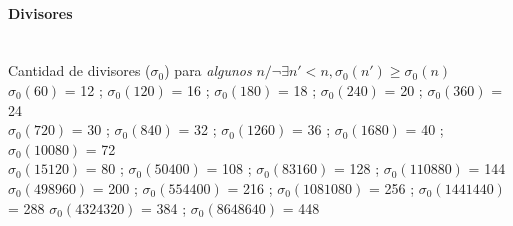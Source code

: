 \paragraph{Divisores} \ \\
Cantidad de divisores ($\sigma_0$) para \emph{algunos} $n / \neg\exists n'<n, \sigma_0(n') \geqslant \sigma_0(n)$ \\
$\sigma_0(60)$ = 12 ; $\sigma_0(120)$ = 16 ; $\sigma_0(180)$ = 18 ; $\sigma_0(240)$ = 20 ; $\sigma_0(360)$ = 24 \\
$\sigma_0(720)$ = 30 ; $\sigma_0(840)$ = 32 ; $\sigma_0(1260)$ = 36 ; $\sigma_0(1680)$ = 40 ; $\sigma_0(10080)$ = 72 \\ $\sigma_0(15120)$ = 80 ; $\sigma_0(50400)$ = 108 ; $\sigma_0(83160)$ = 128 ; $\sigma_0(110880)$ = 144 \\
$\sigma_0(498960)$ = 200 ; $\sigma_0(554400)$ = 216 ; $\sigma_0(1081080)$ = 256 ; $\sigma_0(1441440)$ = 288  $\sigma_0(4324320)$ = 384 ; $\sigma_0(8648640)$ = 448
 
%
%
%


